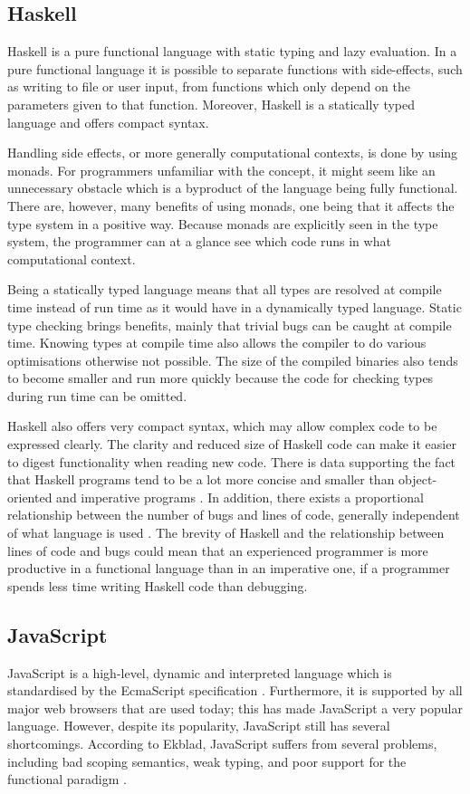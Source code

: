 \documentclass[a4paper]{article}
\begin{document}
\subsection{Haskell}
Haskell is a pure functional language with static typing and lazy evaluation. In a pure functional language it is possible to separate functions with side-effects, such as writing to file or user input, from functions which only depend on the parameters given to that function. Moreover, Haskell is a statically typed language and offers compact syntax.


Handling side effects, or more generally computational contexts, is done by using monads. For programmers unfamiliar with the concept, it might seem like an unnecessary obstacle which is a byproduct of the language being fully functional. There are, however, many benefits of using monads, one being that it affects the type system in a positive way. Because monads are explicitly seen in the type system, the programmer can at a glance see which code runs in what computational context. 

Being a statically typed language means that all types are resolved at compile time instead of run time as it would have in a dynamically typed language. Static type checking brings benefits, mainly that trivial bugs can be caught at compile time. Knowing types at compile time also allows the compiler to do various optimisations otherwise not possible. The size of the compiled binaries also tends to become smaller and run more quickly because the code for checking types during run time can be omitted.

Haskell also offers very compact syntax, which may allow complex code to be expressed clearly. The clarity and reduced size of Haskell code can make it easier to digest functionality when reading new code. There is data supporting the fact that Haskell programs tend to be a lot more concise and smaller than object-oriented and imperative programs \cite{hudak1994haskell}. In addition, there exists a proportional relationship between the number of bugs and lines of code, generally independent of what language is used \cite{mcconnell2004code}. The brevity of Haskell and the relationship between lines of code and bugs could mean that an experienced programmer is more productive in a functional language than in an imperative one, if a programmer spends less time writing Haskell code than debugging.

\subsection{JavaScript}
\label{sec:javascript}
JavaScript is a high-level, dynamic and interpreted language which is standardised by the EcmaScript specification \cite{flanagan2011javascript}. Furthermore, it is supported by all major web browsers that are used today; this has made JavaScript a very popular language. However, despite its popularity, JavaScript still has several shortcomings. According to Ekblad, JavaScript suffers from several problems, including bad scoping semantics, weak typing, and poor support for the functional paradigm \cite{ekblad2012towards}. 
\end{document}
